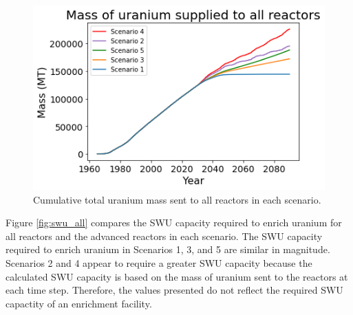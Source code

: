 \begin{figure}
    \centering 
    \includegraphics[scale=0.4]{../figures/fuelsupplytotal_scenarios_all.png}
    \caption{Cumulative total uranium mass sent to all reactors in each scenario.}
    \label{fig:cumulativeU_all}
\end{figure}

Figure \ref{fig:swu_all} compares the \gls{SWU} capacity required to enrich uranium for 
all reactors and the advanced reactors in each scenario. The \gls{SWU} capacity required 
to enrich uranium in Scenarios 1, 3, and 5 are similar in magnitude. Scenarios 2 and 4
appear to require a greater \gls{SWU} capacity because the calculated \gls{SWU} capacity 
is based on the mass of uranium sent to the reactors at each time step. Therefore, 
the values presented do not reflect the required \gls{SWU} capactity of 
an enrichment facility. 

